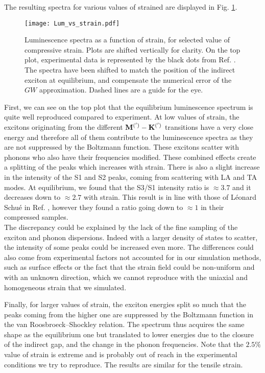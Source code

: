 The resulting spectra for various values of strained are displayed in Fig. \ref{fig:Lum_vs_strain}.
\begin{figure}[tbp]
	\vspace{0.2cm}
	\setcapindent{2em}
	\centering
	\texttt{[image: Lum\_vs\_strain.pdf]}
	\caption{Luminescence spectra as a function of strain, for selected value of compressive strain. Plots are shifted vertically for clarity. On the top plot, experimental data is represented by the black dots from Ref. \cite{schue2019bright}. The spectra have been shifted to match the position of the indirect exciton at equilibrium, and compensate the numerical error of the $GW$ approximation.\cite{artus2021ellipsometry} Dashed lines are a guide for the eye.}
	\label{fig:Lum_vs_strain}
\end{figure}
First, we can see on the top plot that the equilibrium luminescence spectrum is quite well reproduced compared to experiment. At low values of strain, the excitons originating from the different $\bf{ M^{(')}} - \bf{ K^{(')}}$ transitions have a very close energy and therefore all of them contribute to the luminescence spectra as they are not suppressed by the Boltzmann function. These excitons scatter with phonons who also have their frequencies modified. These combined effects create a splitting of the peaks which increases with strain. There is also a slight increase in the intensity of the S1 and S2 peaks, coming from scattering with LA and TA modes. At equilibrium, we found that the S3/S1 intensity ratio is $\approx 3.7$ and it decreases down to $\approx 2.7$ with strain. This result is in line with those of Léonard Schué in Ref. \cite{schue2017proprietes}, however they found a ratio going down to $\approx 1$ in their compressed samples.\\ 
The discrepancy could be explained by the lack of the fine sampling of the exciton and phonon dispersions. Indeed with a larger density of states to scatter, the intensity of some peaks could be increased even more. The differences could also come from experimental factors not accounted for in our simulation methods, such as surface effects or the fact that the strain field could be non-uniform and with an unknown direction, which we cannot reproduce with the uniaxial and homogeneous strain that we simulated.  

Finally, for larger values of strain, the exciton energies split so much that the peaks coming from the higher one are suppressed by the Boltzmann function in the van Roosbroeck--Shockley relation. The spectrum thus acquires the same shape as the equilibrium one but translated to lower energies due to the closure of the indirect gap, and the change in the phonon frequencies. Note that the $2.5\%$ value of strain is extreme and is probably out of reach in the experimental conditions we try to reproduce. The results are similar for the tensile strain.


